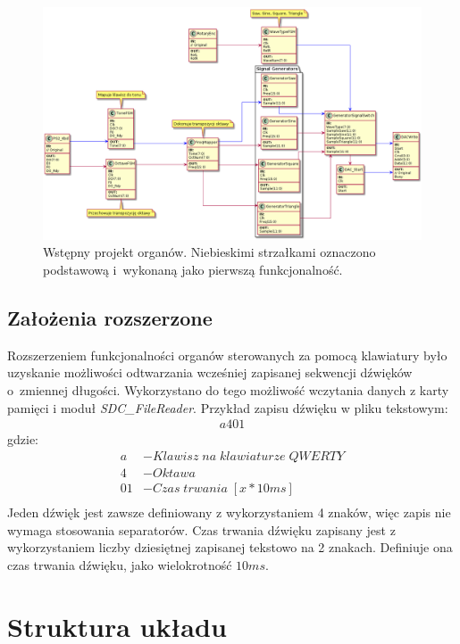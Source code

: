 \documentclass[12pt]{article}
\begin{document}
\begin{figure}[h]
  \centering
  \includegraphics[width=\linewidth]{./diagram/out/flow_chart}
  \caption{Wstępny projekt organów. Niebieskimi strzałkami oznaczono podstawową i~wykonaną jako pierwszą funkcjonalność. }
  \label{base}
\end{figure}

\subsection{Założenia rozszerzone}

Rozszerzeniem funkcjonalności organów sterowanych za pomocą klawiatury było uzyskanie możliwości odtwarzania wcześniej zapisanej sekwencji dźwięków o~zmiennej długości. Wykorzystano do tego możliwość wczytania danych z karty pamięci i moduł \textit{SDC\_FileReader}.
Przykład zapisu dźwięku w pliku tekstowym:
\begin{align*}
  a401
\end{align*}
gdzie:
\begin{align*}
  a                & - Klawisz\;na\;klawiaturze\;QWERTY \\
  4                & - Oktawa                           \\
  01 & - Czas\;trwania\;[x*10ms]           \\
\end{align*}
Jeden dźwięk jest zawsze definiowany z wykorzystaniem 4 znaków, więc zapis nie wymaga stosowania separatorów. Czas trwania dźwięku zapisany jest z wykorzystaniem liczby dziesiętnej zapisanej tekstowo na 2 znakach. Definiuje ona czas trwania dźwięku, jako wielokrotność $10ms$.

\section{Struktura układu}
\end{document}
